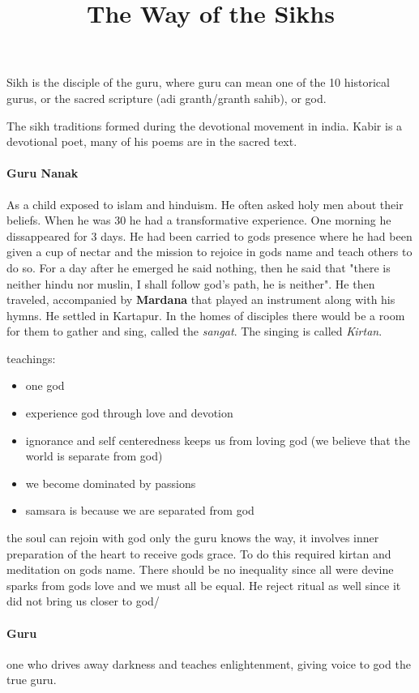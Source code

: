 \documentclass{article}
\begin{document}
\title{The Way of the Sikhs}
\maketitle
Sikh is the disciple of the guru, where guru can mean one of the 10 historical gurus, or the sacred scripture (adi granth/granth sahib), or god.

The sikh traditions formed during the devotional movement in india. Kabir is a devotional poet, many of his poems are in the sacred text.

\paragraph{Guru Nanak}
 \label{par:guru_nanak}
As a child exposed to islam and hinduism. He often asked holy men about their beliefs. When he was 30 he had a transformative experience. One morning he dissappeared for 3 days. He had been carried to gods presence where he had been given a cup of nectar and the mission to rejoice in gods name and teach others to do so. For a day after he emerged he said nothing, then he said that "there is neither hindu nor muslin, I shall follow god's path, he is neither". He then traveled, accompanied by \textbf{Mardana} that played an instrument along with his hymns. He settled in Kartapur. In the homes of disciples there would be a room for them to gather and sing, called the \emph{sangat}. The singing is called \emph{Kirtan}.

teachings:
\begin{itemize}
	\item one god
	\item experience god through love and devotion
	\item ignorance and self centeredness keeps us from loving god (we believe that the world is separate from god)
	\item we become dominated by passions
	\item samsara is because we are separated from god
\end{itemize}
 the soul can rejoin with god only the guru knows the way, it involves inner preparation of the heart to receive gods grace. To do this required kirtan and meditation on gods name. There should be no inequality since all were devine sparks from gods love and we must all be equal. He reject ritual as well since it did not bring us closer to god/

\paragraph{Guru}
\label{par:guru}
one who drives away darkness and teaches enlightenment, giving voice to god the true guru.
\end{document}
